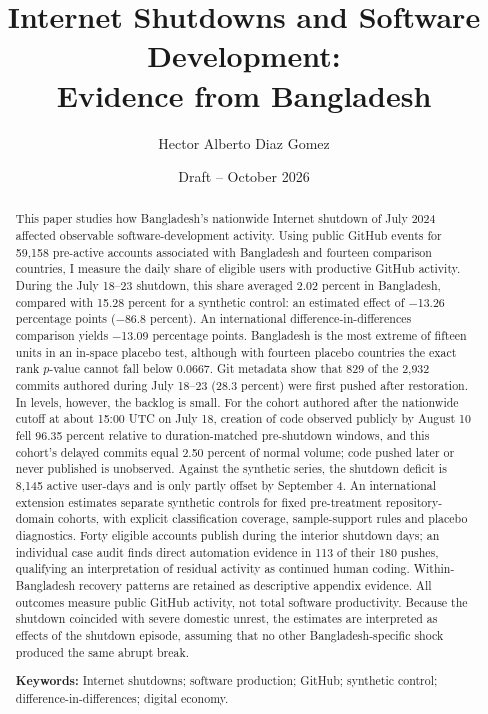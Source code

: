 \documentclass[12pt,letterpaper]{article}
\title{Internet Shutdowns and Software Development:\\[4pt]
  \large Evidence from Bangladesh}
\author{Hector Alberto Diaz Gomez}
\date{Draft -- October 2026}
\begin{document}
\maketitle
\begin{abstract}
\noindent This paper studies how Bangladesh's nationwide Internet shutdown of July 2024 affected observable software-development activity. Using public GitHub events for 59,158 pre-active accounts associated with Bangladesh and fourteen comparison countries, I measure the daily share of eligible users with productive GitHub activity. During the July 18--23 shutdown, this share averaged 2.02 percent in Bangladesh, compared with 15.28 percent for a synthetic control: an estimated effect of $-$13.26 percentage points ($-$86.8 percent). An international difference-in-differences comparison yields $-$13.09 percentage points. Bangladesh is the most extreme of fifteen units in an in-space placebo test, although with fourteen placebo countries the exact rank $p$-value cannot fall below 0.0667. Git metadata show that 829 of the 2,932 commits authored during July 18--23 (28.3 percent) were first pushed after restoration. In levels, however, the backlog is small. For the cohort authored after the nationwide cutoff at about 15:00 UTC on July 18, creation of code observed publicly by August 10 fell 96.35 percent relative to duration-matched pre-shutdown windows, and this cohort's delayed commits equal 2.50 percent of normal volume; code pushed later or never published is unobserved. Against the synthetic series, the shutdown deficit is 8,145 active user-days and is only partly offset by September 4. An international extension estimates separate synthetic controls for fixed pre-treatment repository-domain cohorts, with explicit classification coverage, sample-support rules and placebo diagnostics. Forty eligible accounts publish during the interior shutdown days; an individual case audit finds direct automation evidence in 113 of their 180 pushes, qualifying an interpretation of residual activity as continued human coding. Within-Bangladesh recovery patterns are retained as descriptive appendix evidence. All outcomes measure public GitHub activity, not total software productivity. Because the shutdown coincided with severe domestic unrest, the estimates are interpreted as effects of the shutdown episode, assuming that no other Bangladesh-specific shock produced the same abrupt break.

\medskip
\noindent\textbf{Keywords:} Internet shutdowns; software production; GitHub; synthetic control; difference-in-differences; digital economy.
\end{abstract}
\clearpage
{}












\begingroup
\singlespacing

\endgroup

\clearpage
\appendix

\end{document}
